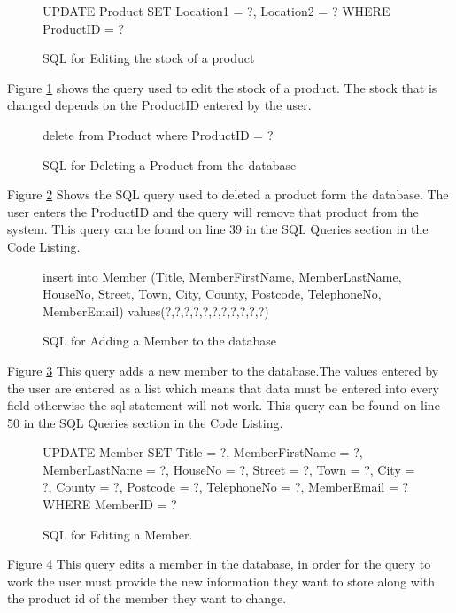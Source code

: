\begin{figure}[H]
	 \caption{SQL for Editing the stock of a product} \label{fig:stock-sql}
\begin{sql} 
UPDATE Product SET Location1 = ?, Location2 = ? WHERE ProductID = ? 
\end{sql}
\end{figure}
Figure \ref{fig:stock-sql} shows the query used to edit the stock of a product. The stock that is changed depends on the ProductID entered by the user.

\begin{figure}[H]
	 \caption{SQL for Deleting a Product from the database} \label{fig:delete-product-sql}
\begin{sql} 
delete from Product where ProductID = ?
\end{sql}
\end{figure}
Figure \ref{fig:delete-product-sql} Shows the SQL query used to deleted a product form the database. The user enters the ProductID and the query will remove that product from the system. This query can be found on line 39 in the SQL Queries section in the Code Listing.

\begin{figure}[H]
	 \caption{SQL for Adding a Member to the database} \label{fig:add-member-sql}
\begin{sql} 
insert into Member (Title, MemberFirstName, MemberLastName, HouseNo, Street, Town, City, County, Postcode, TelephoneNo, MemberEmail) values(?,?,?,?,?,?,?,?,?,?,?)
 \end{sql}
\end{figure}
Figure \ref{fig:add-member-sql} This query adds a new member to the database.The values entered by the user are entered as a list which means that data must be entered into every field otherwise the sql statement will not work.  This query can be found on line 50 in the SQL Queries section in the Code Listing.

\begin{figure}[H]
	 \caption{SQL for Editing a Member.} \label{fig:edit-member-sql}
\begin{sql} 
UPDATE Member SET Title = ?,
                                   MemberFirstName = ?,
                                   MemberLastName = ?,
                                   HouseNo = ?,
                                   Street = ?,
                                   Town = ?,
                                   City = ?,
                                   County = ?,
                                   Postcode = ?,
                                   TelephoneNo = ?,
                                   MemberEmail = ?
                                   WHERE MemberID = ?
\end{sql}
\end{figure}
Figure \ref{fig:edit-member-sql} This query edits a member in the database, in order for the query to work the user must provide the new information they want to store along with the product id of the member they want to change.



